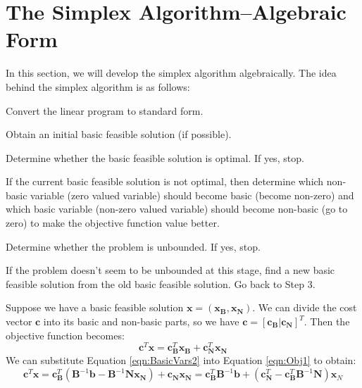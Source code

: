 \section{The Simplex Algorithm--Algebraic Form}
In this section, we will develop the simplex algorithm algebraically. The idea behind the simplex algorithm is as follows:
\begin{enumerate*}
\item Convert the linear program to standard form.
\item Obtain an initial basic feasible solution (if possible).
\item Determine whether the basic feasible solution is optimal. If yes, stop.
\item If the current basic feasible solution is not optimal, then determine which non-basic variable (zero valued variable) should become basic (become non-zero) and which basic variable (non-zero valued variable) should become non-basic (go to zero) to make the objective function value better. 
\item Determine whether the problem is unbounded. If yes, stop.
\item If the problem doesn't seem to be unbounded at this stage, find a new basic feasible solution from the old basic feasible solution. Go back to Step 3. 
\end{enumerate*}

Suppose we have a basic feasible solution $\mathbf{x} = (\mathbf{x_B},\mathbf{x_N})$. We can divide the cost vector $\mathbf{c}$ into its basic and non-basic parts, so we have $\mathbf{c} = [\mathbf{c_B}|\mathbf{c_N}]^T$. Then the objective function becomes:
\begin{equation}
\mathbf{c}^T\mathbf{x} = \mathbf{c}_\mathbf{B}^T\mathbf{x_B} + \mathbf{c}_\mathbf{N}^T\mathbf{x_N}
\label{eqn:Obj1}
\end{equation}
We can substitute Equation \ref{eqn:BasicVars2} into Equation \ref{eqn:Obj1} to obtain:
\begin{equation}
\mathbf{c}^T\mathbf{x} = \mathbf{c}_\mathbf{B}^T\left(\mathbf{B}^{-1}\mathbf{b} - \mathbf{B}^{-1}\mathbf{N}\mathbf{x_N}\right) + 
\mathbf{c_N}\mathbf{x_N} = 
\mathbf{c}_\mathbf{B}^T\mathbf{B}^{-1}\mathbf{b} + 
\left(\mathbf{c}_\mathbf{N}^T - \mathbf{c}_\mathbf{B}^T\mathbf{B}^{-1}\mathbf{N}\right)\mathbf{x}_N
\label{eqn:Obj2}
\end{equation}

